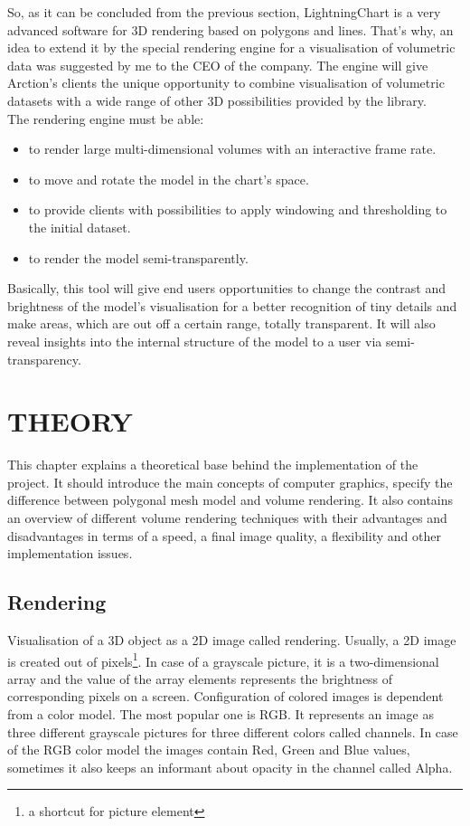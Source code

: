 \documentclass[twoside, english, 11pt]{report}
\begin{document}
So, as it can be concluded from the previous section, LightningChart is a very advanced software for 3D rendering based on polygons and lines. That's why, an idea to extend it by the special rendering engine for a visualisation of volumetric data was suggested by me to the CEO of the company. The engine will give Arction's clients the unique opportunity to combine visualisation of volumetric datasets with a wide range of other 3D possibilities provided by the library. \\

The rendering engine must be able:
\begin{itemize} 
\item to render large multi-dimensional volumes with an interactive frame rate.
\item to move and rotate the model in the chart's space.
\item to provide clients with possibilities to apply windowing and thresholding to the initial dataset.
\item to render the model semi-transparently.
\end{itemize}

Basically, this tool will give end users opportunities to change the contrast and brightness of the model's visualisation for a better recognition of tiny details and make areas, which are out off a certain range, totally transparent. It will also reveal insights into the internal structure of the model to a user via semi-transparency.

\chapter{THEORY}

This chapter explains a theoretical base behind the implementation of the project. It should introduce the main concepts of computer graphics, specify the difference between polygonal mesh model and volume rendering. It also contains an overview of different volume rendering techniques with their advantages and disadvantages in terms of a speed, a final image quality, a flexibility and other implementation issues.

\section{Rendering}

Visualisation of a 3D object as a 2D image called rendering. Usually, a 2D image is created out of pixels\footnote{a shortcut for picture element}. In case of a grayscale picture, it is a two-dimensional array and the value of the array elements represents the brightness of corresponding pixels on a screen. Configuration of colored images is dependent from a color model. The most popular one is RGB. It represents an image as three different grayscale pictures for three different colors called channels. In case of the RGB color model the images contain Red, Green and Blue values, sometimes it also keeps an informant about opacity in the channel called Alpha.\\
\end{document}
